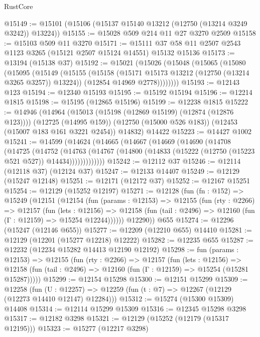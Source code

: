 \begin{lexlean}{RustCore}
\begin{coremodule}
@15149 := @15101 (@15106 (@15137 @15140 @13212 (@12750 (@13214 @3249 @3242)) @13224))
@15155 := @15028 @509 @214 @11 @27 @3270 @2509
@15158 := @15103 @509 @11 @3270
@15171 := @15111 @37 @58 @11 @2507 @2543 @1123 @3265 (@15121 @2507 @15124 @14551) @15132 @15136
@15173 := @13194 (@15138 @37)
@15192 := @15021
    (@15026
      (@15048
        (@15065
          (@15080
            (@15095
              (@15149
                (@15155
                  (@15158 (@15171 @15173 @13212 (@12750 (@13214 @3265 @3257)) @13224))
                  (@12854 @14969 @2778))))))))
@15193 := @12143 @123
@15194 := @12340 @15193
@15195 := @15192 @15194
@15196 := @12214 @1815
@15198 := @15195 (@12865 @15196)
@15199 := @12238 @1815
@15222 := @14946
    (@14964
      (@15013 (@15198 (@12869 @15199) (@12874 (@12876 @123))))
      (@12725 (@14995 @159))
      (@12750 (@15000 @526 @183))
      (@12453 (@15007 @183 @161 @3221 @2454))
      @14832)
    @14422
@15223 := @14427 @1002
@15241 := @14599
    (@14624
      (@14665
        (@14667
          (@14669
            (@14690
              (@14708
                (@14725
                  (@14752
                    (@14763
                      (@14767
                        (@14800 (@14833 (@15222 (@12750 (@15223 @521 @527)) @14434)))))))))))))
@15242 := @12112 @37
@15246 := @12114 (@12118 @37) (@12124 @37)
@15247 := @12133 @14407
@15249 := @12129 (@15247 @12148)
@15251 := @12171 (@12172 @37)
@15252 := @12167 @15251
@15254 := @12129 (@15252 @12197)
@15271 := @12128
    (fun (fn : @152) =>
    @15249
      (@12151
        (@12154
          (fun (params : @12153) =>
          @12155
            (fun (rty : @2266) =>
            @12157
              (fun (lets : @12156) =>
              @12158 (fun (tail : @2496) => @12160 (fun (Γ : @12159) => @15254 @12244))))))
        @12290))
    @655
@15274 := @12296 (@15247 (@12146 @655))
@15277 := @12209 (@12210 @655) @14410
@15281 := @12129 (@12201 (@15277 @12218) @12222)
@15282 := @12235 @655
@15287 := @12232 (@12234 @15282 @14413 @12190 @12192)
@15298 := fun (params : @12153) =>
  @12155
    (fun (rty : @2266) =>
    @12157
      (fun (lets : @12156) =>
      @12158 (fun (tail : @2496) => @12160 (fun (Γ : @12159) => @15254 (@15281 @15287)))))
@15299 := @12154 @15298
@15300 := @12151 @15299
@15309 := @12258
    (fun (U : @12257) => @12259 (fun (t : @7) => @12267 (@12129 (@12273 @14410 @12147) @12284)))
@15312 := @15274 (@15300 @15309) @14408
@15314 := @12114 @15299 @15309
@15316 := @12345 @15298 @3298
@15317 := @12182 @3298
@15321 := @12129 (@15252 (@12179 (@15317 @12195)))
@15323 := @15277 (@12217 @3298)

\end{coremodule}
\end{lexlean}
